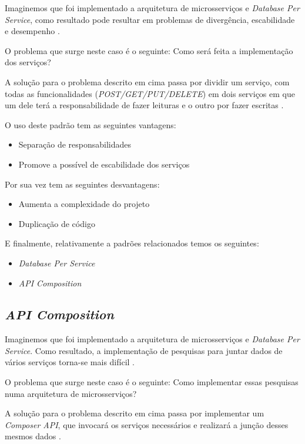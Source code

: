 Imaginemos que foi implementado a arquitetura de microsserviços e \textit{Database Per Service}, como resultado pode resultar em problemas de divergência, escabilidade e desempenho \cite{cqrsPattern}.

O problema que surge neste caso é o seguinte: Como será feita a implementação dos serviços? \cite{cqrsPattern}

A solução para o problema descrito em cima passa por dividir um serviço, com todas as funcionalidades (\textit{POST/GET/PUT/DELETE}) em dois serviços em que um dele terá a responsabilidade de fazer leituras e o outro por fazer escritas \cite{cqrsPattern}.

O uso deste padrão tem as seguintes vantagens:
\begin{itemize}
    \item Separação de responsabilidades \cite{cqrsPattern}
    \item Promove a possível de escabilidade dos serviços \cite{cqrsPattern}
\end{itemize}

Por sua vez tem as seguintes desvantagens:
\begin{itemize}
    \item Aumenta a complexidade do projeto \cite{cqrsPattern}
    \item Duplicação de código \cite{cqrsPattern}
\end{itemize}

E finalmente, relativamente a padrões relacionados temos os seguintes:
\begin{itemize}
    \item \textit{Database Per Service} 
    \item \textit{API Composition} 
\end{itemize}

\subsection{\textit{API Composition}}

Imaginemos que foi implementado a arquitetura de microsserviços e \textit{Database Per Service}. Como resultado, a implementação de pesquisas para juntar dados de vários serviços torna-se mais difícil \cite{apiCompositionPattern}. 

O problema que surge neste caso é o seguinte: Como implementar essas pesquisas numa arquitetura de microsserviços? \cite{apiCompositionPattern}

A solução para o problema descrito em cima passa por implementar um \textit{Composer API}, que invocará os serviços necessários e realizará a junção desses mesmos dados \cite{apiCompositionPattern}.

